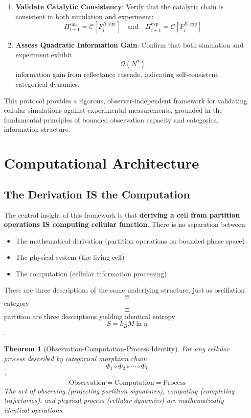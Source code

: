 \documentclass[11pt,twocolumn,a4paper]{article}
\newtheorem{theorem}{Theorem}[section]
\theoremstyle{remark}
\begin{document}
\begin{enumerate}
\item \textbf{Validate Catalytic Consistency}: Verify that the catalytic chain is consistent in both simulation and experiment:
$$
\Pi_{i+1}^{\mathrm{sim}} = \mathcal{C}[F_i^{B,\mathrm{sim}}] \quad \text{and} \quad \Pi_{i+1}^{\mathrm{exp}} = \mathcal{C}[F_i^{B,\mathrm{exp}}]
$$

\item \textbf{Assess Quadratic Information Gain}: Confirm that both simulation and experiment exhibit $$\mathcal{O}(N^2)$$ information gain from reflectance cascade, indicating self-consistent categorical dynamics.
\end{enumerate}

This protocol provides a rigorous, observer-independent framework for validating cellular simulations against experimental measurements, grounded in the fundamental principles of bounded observation capacity and categorical information structure.

\section{Computational Architecture}
\label{sec:computational_architecture}

\subsection{The Derivation IS the Computation}

The central insight of this framework is that \textbf{deriving a cell from partition operations IS computing cellular function}. There is no separation between:
\begin{itemize}
\item The mathematical derivation (partition operations on bounded phase space)
\item The physical system (the living cell)
\item The computation (cellular information processing)
\end{itemize}

These are three descriptions of the same underlying structure, just as oscillation $$\equiv$$ category $$\equiv$$ partition are three descriptions yielding identical entropy $$S = k_B M \ln n$$.

\begin{theorem}[Observation-Computation-Process Identity]
\label{thm:identity}
For any cellular process described by categorical morphism chain $$\Phi_1 \circ \Phi_2 \circ \cdots \circ \Phi_k$$:
$$
\text{Observation} = \text{Computation} = \text{Process}
$$
The act of observing (projecting partition signatures), computing (completing trajectories), and physical process (cellular dynamics) are mathematically identical operations.
\end{theorem}
\end{document}
